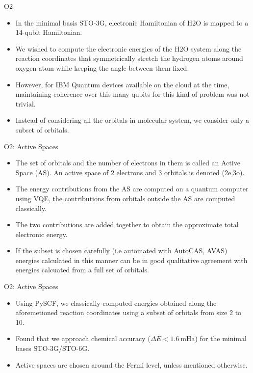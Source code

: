 \begin{frame}{O2}
  \begin{itemize}
    \setlength\itemsep{0.1em}
    \item In the minimal basis STO-3G, electronic Hamiltonian of H2O is mapped to a 14-qubit Hamiltonian.
    \item We wished to compute the electronic energies of the H2O system along the reaction coordinates
          that symmetrically stretch the hydrogen atoms around oxygen atom while keeping the angle between them fixed.
    \item However, for IBM Quantum devices available on the cloud at the time, maintaining coherence over this many qubits for this kind of problem was not trivial.
    \item Instead of considering all the orbitals in molecular system, we consider only a subset of orbitals.
  \end{itemize}
\end{frame}


\begin{frame}{O2: Active Spaces}
  \begin{itemize}
    \setlength\itemsep{0.1em}
    \item The set of orbitals and the number of electrons in them is called an {\color{red} Active Space (AS)}.
          An active space of 2 electrons and 3 orbitals is denoted (2e,3o).
    \item The energy contributions from the AS are computed on a quantum computer using VQE,
          the contributions from orbitals outside the AS are computed classically.
    \item The two contributions are added together to obtain the approximate total electronic energy.
    \item If the subset is chosen carefully (i.e automated with {\color{blue}AutoCAS, AVAS}) energies calculated in this manner can be in good qualitative
          agreement with energies calcuated from a full set of orbitals.
  \end{itemize}
\end{frame}


\begin{frame}{O2: Active Spaces}
  \begin{itemize}
    \setlength\itemsep{0.1em}
    \item Using PySCF, we classically computed energies obtained along the aforemetioned reaction coordinates
          using a subset of orbitals from size 2 to 10.
    \item Found that we approach {\color{red}chemical accuracy ($\Delta E < 1.6 \>\text{mHa}$)} for the minimal bases STO-3G/STO-6G.
    \item Active spaces are chosen around the {\color{red}Fermi level}, unless mentioned otherwise.
  \end{itemize}
\end{frame}


